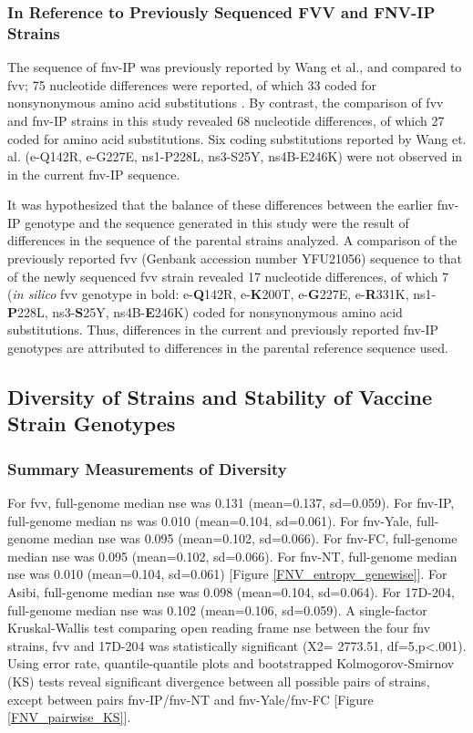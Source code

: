 \subsubsection{In Reference to Previously Sequenced FVV and FNV-IP Strains}
The sequence of \gls{fnv}-IP was previously reported by Wang et al., and compared to \gls{fvv}; 75 nucleotide differences were reported, of which 33 coded for nonsynonymous amino acid substitutions \parencite{Wang:1995vu}. By contrast, the comparison of \gls{fvv} and \gls{fnv}-IP strains in this study revealed 68 nucleotide differences, of which 27 coded for amino acid substitutions. Six coding substitutions reported by Wang et. al. (\gls{e}-Q142R, \gls{e}-G227E, \gls{ns}1-P228L, \gls{ns}3-S25Y, \gls{ns}4B-E246K) were not observed in in the current \gls{fnv}-IP sequence.

It was hypothesized that the balance of these differences between the earlier \gls{fnv}-IP genotype and the sequence generated in this study were the result of differences in the sequence of the parental strains analyzed. A comparison of the previously reported \gls{fvv} (Genbank accession number YFU21056) sequence to that of the newly sequenced \gls{fvv} strain revealed 17 nucleotide differences, of which 7 (\emph{in silico} \gls{fvv} genotype in bold: \gls{e}-\textbf{Q}142R, \gls{e}-\textbf{K}200T, \gls{e}-\textbf{G}227E, \gls{e}-\textbf{R}331K, \gls{ns}1-\textbf{P}228L, \gls{ns}3-\textbf{S}25Y, \gls{ns}4B-\textbf{E}246K) coded for nonsynonymous amino acid substitutions. Thus, differences in the current and previously reported \gls{fnv}-IP genotypes are attributed to differences in the parental reference sequence used.

\subsection{Diversity of Strains and Stability of Vaccine Strain Genotypes}
\subsubsection{Summary Measurements of Diversity}
For \gls{fvv}, full-genome median \gls{nse} was 0.131 (mean=0.137, \gls{sd}=0.059).  For \gls{fnv}-IP, full-genome median \gls{ns} was 0.010 (mean=0.104, \gls{sd}=0.061). For \gls{fnv}-Yale, full-genome median \gls{nse} was 0.095 (mean=0.102, \gls{sd}=0.066). For \gls{fnv}-FC, full-genome median \gls{nse} was 0.095 (mean=0.102, \gls{sd}=0.066). For \gls{fnv}-NT, full-genome median \gls{nse} was 0.010 (mean=0.104, \gls{sd}=0.061) [Figure \ref{FNV_entropy_genewise}]. For Asibi, full-genome median \gls{nse} was 0.098 (mean=0.104, \gls{sd}=0.064). For 17D-204, full-genome median \gls{nse} was 0.102 (mean=0.106, \gls{sd}=0.059). A single-factor Kruskal-Wallis test comparing open reading frame \gls{nse} between the four \gls{fnv} strains, \gls{fvv} and 17D-204 was statistically significant (X2= 2773.51, df=5,p<.001). Using error rate, quantile-quantile plots and bootstrapped Kolmogorov-Smirnov (KS) tests reveal significant divergence between all possible pairs of strains, except between pairs \gls{fnv}-IP/\gls{fnv}-NT and \gls{fnv}-Yale/\gls{fnv}-FC [Figure \ref{FNV_pairwise_KS}]. 

